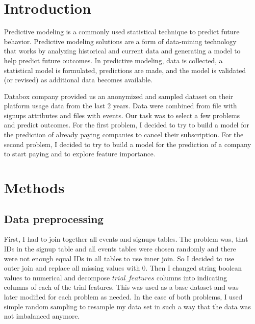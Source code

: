 \documentclass[fleqn,moreauthors,10pt]{ds_report}
\affiliation{\textsuperscript{1}\textit{vz9592@student.uni-lj.si, 63210496}}
\begin{document}
\flushbottom

\maketitle

\thispagestyle{empty}


\section*{Introduction} 
	Predictive modeling is a commonly used statistical technique to predict future behavior. Predictive modeling solutions are a form of data-mining technology that works by analyzing historical and current data and generating a model to help predict future outcomes. In predictive modeling, data is collected, a statistical model is formulated, predictions are made, and the model is validated (or revised) as additional data becomes available.
	
Databox company provided us an anonymized and sampled dataset on their platform usage data from the last 2 years.
 Data were combined
from file with signups attributes and files with events. Our task was to select a few problems and predict outcomes. For the first problem, I decided to try to build a model for the prediction of already paying companies to cancel their subscription.  For the second problem, I decided to try to build a model for the prediction of a company to start paying and to explore feature importance. 



\section*{Methods}

\subsection*{Data preprocessing}
First, I had to join together all events and signups tables. The problem was, that IDs in the signup table and all events tables were chosen randomly and there were not enough equal IDs in all tables to use inner join. So I decided to use outer join and replace all missing values with 0. Then I changed string boolean values to numerical and decompose $trial\_features$ columns into indicating columns of each of the trial features. This was used as a base dataset and was later modified for each problem as needed. In the case of both problems, I used simple random sampling to resample my data set in such a way that the data was not imbalanced anymore.
\end{document}
